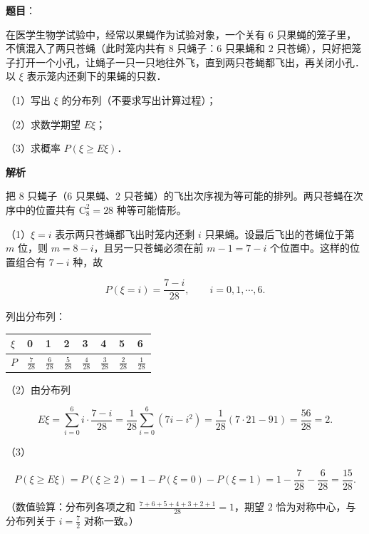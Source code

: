 \begin{answer}

\textbf{题目}：

在医学生物学试验中，经常以果蝇作为试验对象，一个关有 $6$ 只果蝇的笼子里，不慎混入了两只苍蝇（此时笼内共有 $8$ 只蝇子：$6$ 只果蝇和 $2$ 只苍蝇），只好把笼子打开一个小孔，让蝇子一只一只地往外飞，直到两只苍蝇都飞出，再关闭小孔．以 $\xi$ 表示笼内还剩下的果蝇的只数．

（1）写出 $\xi$ 的分布列（不要求写出计算过程）；

（2）求数学期望 $E\xi$；

（3）求概率 $P(\xi\geqslant E\xi)$．

\textbf{解析}

把 $8$ 只蝇子（$6$ 只果蝇、$2$ 只苍蝇）的飞出次序视为等可能的排列。两只苍蝇在次序中的位置共有 $\mathrm C_8^2=28$ 种等可能情形。

（1）$\xi=i$ 表示两只苍蝇都飞出时笼内还剩 $i$ 只果蝇。设最后飞出的苍蝇位于第 $m$ 位，则 $m=8-i$，且另一只苍蝇必须在前 $m-1=7-i$ 个位置中。这样的位置组合有 $7-i$ 种，故

\nopagebreak[4]
\[P(\xi=i)=\frac{7-i}{28},\qquad i=0,1,\cdots,6.\]

列出分布列：

\begin{center}
\begingroup\setlength{\tabcolsep}{4pt}
\begin{tabular}{llllllll}
\toprule
$\xi$ & 0 & 1 & 2 & 3 & 4 & 5 & 6 \\
\midrule
$P$ & $\frac{7}{28}$ & $\frac{6}{28}$ & $\frac{5}{28}$ & $\frac{4}{28}$ & $\frac{3}{28}$ & $\frac{2}{28}$ & $\frac{1}{28}$ \\
\bottomrule
\end{tabular}
\endgroup
\end{center}

（2）由分布列

\nopagebreak[4]
\[E\xi=\sum_{i=0}^{6}i\cdot\frac{7-i}{28}=\frac{1}{28}\sum_{i=0}^{6}(7i-i^2)=\frac{1}{28}\left(7\cdot21-91\right)=\frac{56}{28}=2.\]

（3）

\nopagebreak[4]
\[P(\xi\geqslant E\xi)=P(\xi\geqslant2)=1-P(\xi=0)-P(\xi=1)=1-\frac{7}{28}-\frac{6}{28}=\frac{15}{28}.\]

（数值验算：分布列各项之和 $\frac{7+6+5+4+3+2+1}{28}=1$，期望 $2$ 恰为对称中心，与分布列关于 $i=\frac72$ 对称一致。）


\end{answer}

